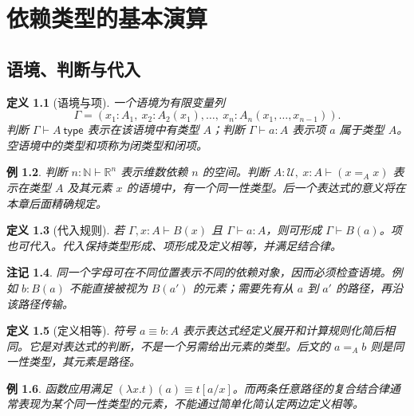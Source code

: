\documentclass[12pt,oneside,openany,fontset=none]{ctexbook}
\theoremstyle{cn}
\newtheorem{definition}{定义}[chapter]
\newtheorem{example}[definition]{例}
\newtheorem{remark}[definition]{注记}
\numberwithin{equation}{chapter}
\newcommand{\U}{\mathcal U}
\newcommand{\N}{\mathbb N}
\newcommand{\R}{\mathbb R}
\begin{document}
\chapter{依赖类型的基本演算}
\section{语境、判断与代入}
\begin{definition}[语境与项]
一个语境为有限变量列
\[
\Gamma=(x_1:A_1,\ x_2:A_2(x_1),\ldots,\ x_n:A_n(x_1,\ldots,x_{n-1})).
\]
判断 $\Gamma\vdash A\ \mathsf{type}$ 表示在该语境中有类型 $A$；判断 $\Gamma\vdash a:A$ 表示项 $a$ 属于类型 $A$。空语境中的类型和项称为闭类型和闭项。
\end{definition}
\begin{example}
判断 $n:\N\vdash\R^n$ 表示维数依赖 $n$ 的空间。判断 $A:\U,\ x:A\vdash(x=_Ax)$ 表示在类型 $A$ 及其元素 $x$ 的语境中，有一个同一性类型。后一个表达式的意义将在本章后面精确规定。
\end{example}
\begin{definition}[代入规则]
若 $\Gamma,x:A\vdash B(x)$ 且 $\Gamma\vdash a:A$，则可形成 $\Gamma\vdash B(a)$。项也可代入。代入保持类型形成、项形成及定义相等，并满足结合律。
\end{definition}
\begin{remark}
同一个字母可在不同位置表示不同的依赖对象，因而必须检查语境。例如 $b:B(a)$ 不能直接被视为 $B(a')$ 的元素；需要先有从 $a$ 到 $a'$ 的路径，再沿该路径传输。
\end{remark}
\begin{definition}[定义相等]
符号 $a\equiv b:A$ 表示表达式经定义展开和计算规则化简后相同。它是对表达式的判断，不是一个另需给出元素的类型。后文的 $a=_Ab$ 则是同一性类型，其元素是路径。
\end{definition}
\begin{example}
函数应用满足 $(\lambda x.t)(a)\equiv t[a/x]$。而两条任意路径的复合结合律通常表现为某个同一性类型的元素，不能通过简单化简认定两边定义相等。
\end{example}
\end{document}
